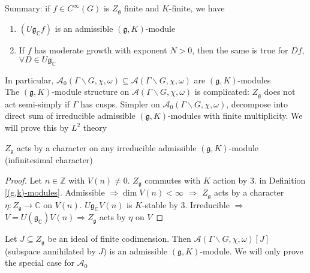 \documentclass[main]{subfiles}
\begin{document}
Summary: if $f\in C^\infty(G)$ is $Z_{\mathfrak g}$ finite and $K$-finite, we have
\begin{enumerate}
\item $(U\mathfrak g_{\mathbb C}f)$ is an admissible $(\mathfrak g,K)$-module
\item If $f$ has moderate growth with exponent $N>0$, then the same is true for $Df$, $\forall D\in U\mathfrak g_{\mathbb C}$
\end{enumerate}
In particular, $\mathcal A_0(\Gamma\backslash G,\chi,\omega)\subseteq \mathcal A(\Gamma\backslash G,\chi,\omega)$ are $(\mathfrak g,K)$-modules \\
The $(\mathfrak g,K)$-module structure on $\mathcal A(\Gamma\backslash G,\chi,\omega)$ is complicated: $Z_{\mathfrak g}$ does not act semi-simply if $\Gamma$ has cusps. Simpler on $\mathcal A_0(\Gamma\backslash G,\chi,\omega)$, decompose into direct sum of irreducible admissible $(\mathfrak g,K)$-modules with finite multiplicity. We will prove this by $L^2$ theory

\begin{lemma}[Schur]\label{Schur's lemma}
$Z_{\mathfrak g}$ acts by a character on any irreducible admissible $(\mathfrak g,K)$-module (infinitesimal character)
\end{lemma}

\begin{proof}
Let $n\in\mathbb Z$ with $V(n)\neq 0$. $Z_{\mathfrak g}$ commutes with $K$ action by 3. in Definition \ref{(g,k)-modules}. Admissible $\Rightarrow\dim V(n)<\infty$ $\Rightarrow$ $Z_{\mathfrak g}$ acts by a character $\eta:Z_{\mathfrak g}\to\mathbb C$ on $V(n)$. $U\mathfrak g_{\mathbb C}V(n)$ is $K$-stable by 3. Irreducible $\Rightarrow$ $V=U(\mathfrak g_{\mathbb C})V(n)\Rightarrow Z_{\mathfrak g}$ acts by $\eta$ on $V$
\end{proof}

\begin{theorem}\label{Another theorem of Harish-Chandra}
Let $J\subseteq Z_{\mathfrak g}$ be an ideal of finite codimension. Then $\mathcal A(\Gamma\backslash G,\chi,\omega)[J]$ (subspace annihilated by $J$) is an admissible $(\mathfrak g,K)$-module. We will only prove the special case for $\mathcal A_0$
\end{theorem}
\end{document}
